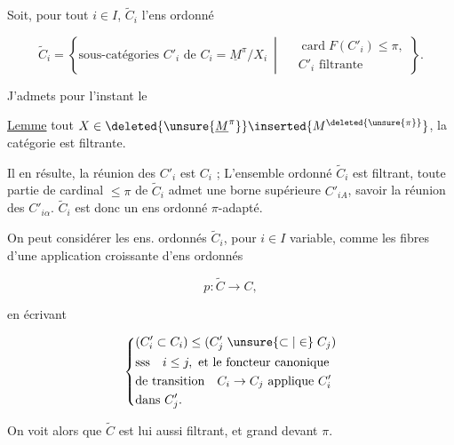 
Soit, pour tout $i\in I$, $\widetilde C_i$ l'ens ordonné

\[
 \widetilde C_i=\left\{\text{sous-catégories } C'_i\text{ de }C_i=\underline M^{\pi}/X_i
 \ \middle|\ \begin{aligned}&\operatorname{card} F(C'_i)\leq\pi,\\& C'_i\text{ filtrante}\end{aligned}\right\}.
\]

J'admets pour l'instant le


\uline{Lemme}  tout $X\in\deleted{\unsure{\underline M^\pi}}\inserted{M^{\deleted{\unsure{\pi}}}}$, la catégorie   est filtrante. 

Il en résulte,   la réunion des $C'_i$  est $C_i$ ;  L'ensemble ordonné $\widetilde C_i$ est filtrant,  toute partie  de cardinal $\leq\pi$ de $\widetilde C_i$ admet une borne supérieure $C'_{iA}$, savoir la réunion des $C'_{i\alpha}$. $\widetilde C_i$ est donc un ens ordonné $\pi$-adapté. 

On peut considérer les ens. ordonnés $\widetilde C_i$, pour $i\in I$ variable, comme les fibres d'une application croissante d'ens ordonnés

\[
 p:\widetilde C\longrightarrow C,
\]

en  écrivant

\[
 \left\{\begin{aligned}
 &(C'_i\subset C_i)\leq(C'_j\mathrel{\unsure{\subset|\in}} C_j)\\
 &\text{sss}\quad i\leq j,\ \text{et le foncteur canonique}\\
 &\text{de transition}\quad C_i\to C_j\ \text{applique }C'_i\\
 &\text{dans }C'_j.
 \end{aligned}\right.
\]

On voit alors que $\widetilde C$ est lui aussi filtrant, et grand devant $\pi$.

